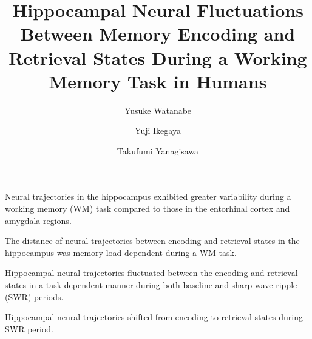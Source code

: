 \documentclass[final,3p,times,twocolumn]{elsarticle}
\begin{document}
\begin{frontmatter}
\begin{highlights}

\item Neural trajectories in the hippocampus exhibited greater variability during a working memory (WM) task compared to those in the entorhinal cortex and amygdala regions.

\item The distance of neural trajectories between encoding and retrieval states in the hippocampus was memory-load dependent during a WM task.


\item Hippocampal neural trajectories fluctuated between the encoding and retrieval states in a task-dependent manner during both baseline and sharp-wave ripple (SWR) periods.

\item Hippocampal neural trajectories shifted from encoding to retrieval states during SWR period.

\end{highlights}\title{
Hippocampal Neural Fluctuations Between Memory Encoding and Retrieval States During a Working Memory Task in Humans
}\author[1]{Yusuke Watanabe}
\author[2,3,4]{Yuji Ikegaya}
\author[1,5]{Takufumi Yanagisawa}

\address[1]{Institute for Advanced Cocreation studies, Osaka University, 2-2 Yamadaoka, Suita, 565-0871, Osaka, Japan}
\address[2]{Graduate School of Pharmaceutical Sciences, The University of Tokyo, 7-3-1 Hongo, Tokyo, 113-0033, Japan}
\address[3]{Institute for AI and Beyond, The University of Tokyo, 7-3-1 Hongo, Tokyo, 113-0033, Japan}
\address[4]{Center for Information and Neural Networks, National Institute of Information and Communications Technology, 1-4 Yamadaoka, Suita City, 565-0871, Osaka, Japan}
\address[5]{Department of Neurosurgery, Osaka University Graduate School of Medicine, 2-2 Yamadaoka, Osaka, 565-0871, Japan}



\end{frontmatter}
\end{document}
